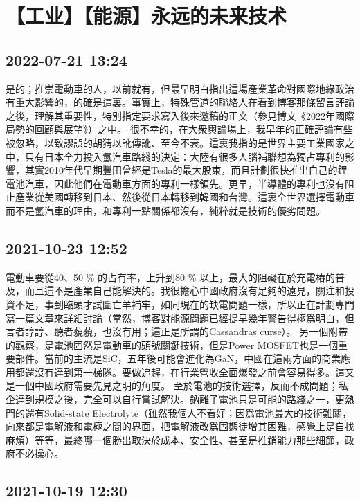 \documentclass[twocolumn]{ctexart}
\begin{document}
\section*{【工业】【能源】永远的未来技术}
\subsection*{2022-07-21 13:24}

是的；推崇電動車的人，以前就有，但最早明白指出這場產業革命對國際地緣政治有重大影響的，的確是這裏。事實上，特殊管道的聯絡人在看到博客那條留言評論之後，理解其重要性，特別指定要求寫入後來邀稿的正文（參見博文《2022年國際局勢的回顧與展望》）之中。
很不幸的，在大衆輿論場上，我早年的正確評論有些被忽略，以致謬誤的胡猜以訛傳訛、至今不衰。這裏我指的是世界主要工業國家之中，只有日本全力投入氫汽車路綫的決定：大陸有很多人腦補聯想為獨占專利的影響，其實2010年代早期豐田曾經是Tesla的最大股東，而且計劃很快推出自己的鋰電池汽車，因此他們在電動車方面的專利一樣領先。更早，半導體的專利也沒有阻止產業從美國轉移到日本、然後從日本轉移到韓國和台灣。這裏全世界選擇電動車而不是氫汽車的理由，和專利一點關係都沒有，純粹就是技術的優劣問題。
\subsection*{2021-10-23 12:52}

電動車要從40、50 \% 的占有率，上升到80 \% 以上，最大的阻礙在於充電樁的普及，而且這不是產業自己能解決的。我很擔心中國政府沒有足夠的遠見，關注和投資不足，事到臨頭才試圖亡羊補牢，如同現在的缺電問題一樣，所以正在計劃專門寫一篇文章來詳細討論（當然，博客對能源問題已經提早幾年警告得極爲明白，但言者諄諄、聽者藐藐，也沒有用；這正是所謂的Cassandras curse）。
另一個附帶的觀察，是電池固然是電動車的頭號關鍵技術，但是Power MOSFET也是一個重要部件。當前的主流是SiC，五年後可能會進化為GaN，中國在這兩方面的商業應用都還沒有達到第一梯隊。要做追趕，在行業營收全面爆發之前會容易得多。這又是一個中國政府需要先見之明的角度。
至於電池的技術選擇，反而不成問題；私企達到規模之後，完全可以自行嘗試解決。鈉離子電池只是可能的路綫之一，更熱門的還有Solid-state Electrolyte（雖然我個人不看好；因爲電池最大的技術難關，向來都是電解液和電極之間的界面，把電解液改爲固態徒增其困難，感覺上是自找麻煩）等等，最終哪一個勝出取決於成本、安全性、甚至是推銷能力那些細節，政府不必操心。
\subsection*{2021-10-19 12:30}
\end{document}

